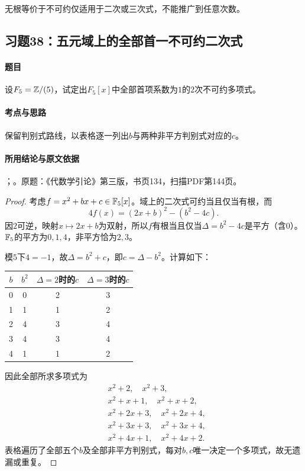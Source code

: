 无根等价于不可约仅适用于二次或三次式，不能推广到任意次数。



\subsection{习题38：五元域上的全部首一不可约二次式}

\label{ex:3:38}

\paragraph{题目}

设$F_5=\mathbb Z/(5)$，试定出$F_5[x]$中全部首项系数为$1$的$2$次不可约多项式。

\paragraph{考点与思路}

保留判别式路线，以表格逐一列出$b$与两种非平方判别式对应的$c$。

\paragraph{所用结论与原文依据}

；。原题：《代数学引论》第三版，书页134，扫描PDF第144页。


\begin{proof}

考虑$f=x^2+bx+c\in\mathbb F_5[x]$。域上的二次式可约当且仅当有根，而
\[
4f(x)=(2x+b)^2-(b^2-4c).
\]
因$2$可逆，映射$x\mapsto2x+b$为双射，所以$f$有根当且仅当$\Delta=b^2-4c$是平方（含$0$）。$\mathbb F_5$的平方为$0,1,4$，非平方恰为$2,3$。

模$5$下$4=-1$，故$\Delta=b^2+c$，即$c=\Delta-b^2$。计算如下：
\begin{center}\begin{tabular}{c|c|cc}
$b$&$b^2$&$\Delta=2$时的$c$&$\Delta=3$时的$c$\\\hline
0&0&2&3\\1&1&1&2\\2&4&3&4\\3&4&3&4\\4&1&1&2
\end{tabular}\end{center}
因此全部所求多项式为
\begin{align*}
&x^2+2,\quad x^2+3,\\
&x^2+x+1,\quad x^2+x+2,\\
&x^2+2x+3,\quad x^2+2x+4,\\
&x^2+3x+3,\quad x^2+3x+4,\\
&x^2+4x+1,\quad x^2+4x+2.
\end{align*}
表格遍历了全部五个$b$及全部非平方判别式，每对$b,c$唯一决定一个多项式，故无遗漏或重复。

\end{proof}

